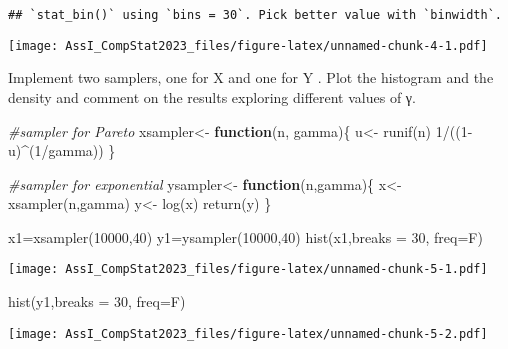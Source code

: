 \documentclass[
]{article}
\newenvironment{Shaded}{\begin{snugshade}}{\end{snugshade}}
\newcommand{\AttributeTok}[1]{\textcolor[rgb]{0.77,0.63,0.00}{#1}}
\newcommand{\CommentTok}[1]{\textcolor[rgb]{0.56,0.35,0.01}{\textit{#1}}}
\newcommand{\ControlFlowTok}[1]{\textcolor[rgb]{0.13,0.29,0.53}{\textbf{#1}}}
\newcommand{\DecValTok}[1]{\textcolor[rgb]{0.00,0.00,0.81}{#1}}
\newcommand{\FunctionTok}[1]{\textcolor[rgb]{0.00,0.00,0.00}{#1}}
\newcommand{\NormalTok}[1]{#1}
\newcommand{\OtherTok}[1]{\textcolor[rgb]{0.56,0.35,0.01}{#1}}
\newcommand{\SpecialCharTok}[1]{\textcolor[rgb]{0.00,0.00,0.00}{#1}}
\begin{document}
\begin{verbatim}
## `stat_bin()` using `bins = 30`. Pick better value with `binwidth`.
\end{verbatim}

\texttt{[image: AssI\_CompStat2023\_files/figure-latex/unnamed-chunk-4-1.pdf]}

Implement two samplers, one for X and one for Y . Plot the histogram and
the density and comment on the results exploring different values of γ.

\begin{Shaded}
\begin{Highlighting}[]
\CommentTok{\#sampler for Pareto}
\NormalTok{xsampler}\OtherTok{\textless{}{-}} \ControlFlowTok{function}\NormalTok{(n, gamma)\{}
\NormalTok{  u}\OtherTok{\textless{}{-}} \FunctionTok{runif}\NormalTok{(n)}
  \DecValTok{1}\SpecialCharTok{/}\NormalTok{((}\DecValTok{1}\SpecialCharTok{{-}}\NormalTok{u)}\SpecialCharTok{\^{}}\NormalTok{(}\DecValTok{1}\SpecialCharTok{/}\NormalTok{gamma))}
\NormalTok{\}}

\CommentTok{\#sampler for exponential}
\NormalTok{ysampler}\OtherTok{\textless{}{-}} \ControlFlowTok{function}\NormalTok{(n,gamma)\{}
\NormalTok{  x}\OtherTok{\textless{}{-}} \FunctionTok{xsampler}\NormalTok{(n,gamma)}
\NormalTok{  y}\OtherTok{\textless{}{-}} \FunctionTok{log}\NormalTok{(x)}
  \FunctionTok{return}\NormalTok{(y)}
\NormalTok{\}}

\NormalTok{x1}\OtherTok{=}\FunctionTok{xsampler}\NormalTok{(}\DecValTok{10000}\NormalTok{,}\DecValTok{40}\NormalTok{)}
\NormalTok{y1}\OtherTok{=}\FunctionTok{ysampler}\NormalTok{(}\DecValTok{10000}\NormalTok{,}\DecValTok{40}\NormalTok{)}
\FunctionTok{hist}\NormalTok{(x1,}\AttributeTok{breaks =} \DecValTok{30}\NormalTok{, }\AttributeTok{freq=}\NormalTok{F)}
\end{Highlighting}
\end{Shaded}

\texttt{[image: AssI\_CompStat2023\_files/figure-latex/unnamed-chunk-5-1.pdf]}

\begin{Shaded}
\begin{Highlighting}[]
\FunctionTok{hist}\NormalTok{(y1,}\AttributeTok{breaks =} \DecValTok{30}\NormalTok{, }\AttributeTok{freq=}\NormalTok{F)}
\end{Highlighting}
\end{Shaded}

\texttt{[image: AssI\_CompStat2023\_files/figure-latex/unnamed-chunk-5-2.pdf]}
\end{document}
